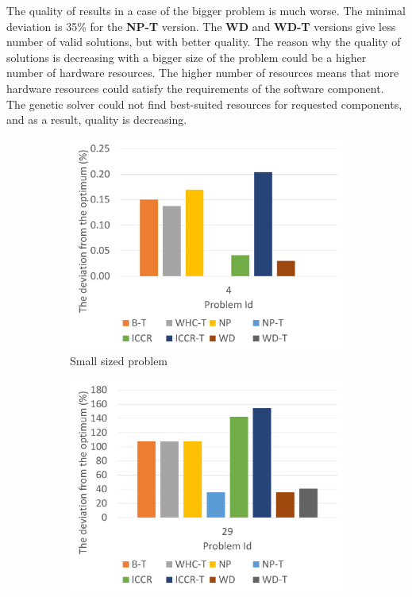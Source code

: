 The quality of results in a case of the bigger problem is much worse. The minimal deviation is 35\% for the \textbf{NP-T} version. The \textbf{WD} and \textbf{WD-T} versions give less number of valid solutions, but with better quality. The reason why the quality of solutions is decreasing with a bigger size of the problem could be a higher number of hardware resources. The higher number of resources means that more hardware resources could satisfy the requirements of the software component. The genetic solver could not find best-suited resources for requested components, and as a result, quality is decreasing. 


\begin{figure}
	\centering
	\begin{subfigure}{0.45\textwidth}
		\includegraphics[width=\textwidth]{images/EnergyDeviationSmallProblem.pdf}
		\caption{Small sized problem}
		\label{fig:SmallProblemEnergy}
	\end{subfigure}
	\hfill
	\begin{subfigure}{0.45\textwidth}
		\includegraphics[width=\textwidth]{images/EnergyDeviationMediumProblem.pdf}

\end{subfigure}
\end{figure}

